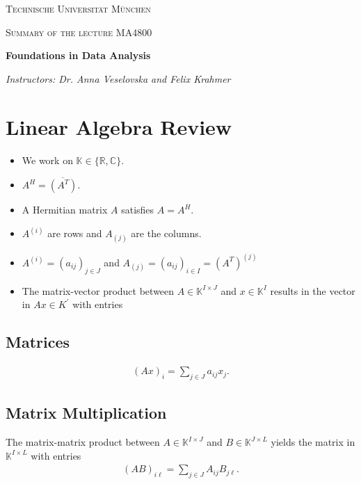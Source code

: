 \documentclass[a4paper, english, headtopline=0.08em, headsepline=0.04em, left = 1cm, right = 1cm, DIV=15]{article}
\begin{document}
{
    \begin{titlepage}
    	\centering
    	\vfill
    	{\scshape\LARGE Technische Universität München \par}
    	\vfill
    	{\scshape\Large Summary of the lecture MA4800\\   \par}
    	{\huge\bfseries Foundations in Data Analysis \par}
    	\vfill
    	{\Large\itshape Instructors: Dr. Anna Veselovska and  Felix Krahmer\par}
    	\vfill
    \end{titlepage}
}

\tableofcontents
\clearpage 

\section{Linear Algebra Review}


\begin{itemize}
	\item We work on $\mathbb{K} \in\{\mathbb{R}, \mathbb{C}\}$.
	\item $A^H = \overline{(A^T)}$.
	\item A Hermitian matrix $A$ satisfies $A=A^H$.
	\item $A^{(i)}$ are rows and $A_{(j)}$ are the columns.
	\item $A^{(i)}=\left(a_{i j}\right)_{j \in J}$ and $A_{(j)}=\left(a_{i j}\right)_{i \in I}=\left(A^{T}\right)^{(j)}$
	\item The matrix-vector product between $A \in \mathbb{K}^{I \times J}$ and $x \in \mathbb{K}^{I}$ results in the vector in $A x \in K^{\prime}$ with entries

\end{itemize}

\subsection{Matrices}

\begin{align*}
	(A x)_{i}=\sum_{j \in J} a_{i j} x_{j} .
\end{align*}
\subsection{Matrix Multiplication}
The matrix-matrix product between $A \in \mathbb{K}^{I\times J}$ and $B \in \mathbb{K}^{J \times L}$ yields the matrix in $\mathbb{K}^{I \times L}$ with entries
\begin{align*}
	(A B)_{i \ell}=\sum_{j \in J} A_{i j} B_{j \ell} .
\end{align*}
\end{document}

